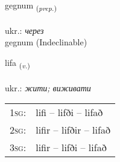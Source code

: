 \documentclass[frontgrid, backgrid]{flacards}\usepackage[]{graphicx}\usepackage[]{xcolor}
\begin{document}
\renewcommand{\blhead}{\vskip5pt {\small\bfseries\footnotesize Forsetning | прийменник }}
\renewcommand{\bcfoot}{\vskip5pt \hspace{2pt}{\small\bfseries\footnotesize 1K}}


{gegnum \small{\textsubscript{(\textit{prep.})}} \\[1ex]
\textphonetic{[cɛknʏm]} \\
ukr.: \emph{через} \\  [2ex]
gegnum (Indeclinable)}

\renewcommand{\flhead}{\vskip5pt \fboxsep=0pt {\small\bfseries\footnotesize Sagnorð | дієслово}}
\renewcommand{\fcfoot}{\vskip5pt \fboxsep=0pt \hspace{2pt}{\small\bfseries\footnotesize 1K}}

\renewcommand{\blhead}{\vskip5pt {\small\bfseries\footnotesize Sagnorð | дієслово }}
\renewcommand{\bcfoot}{\vskip5pt \hspace{2pt}{\small\bfseries\footnotesize 1K}}


{lifa \small{\textsubscript{(\textit{v.})}} \\[1ex] %
\textphonetic{[lɪːva]} \\
ukr.: \emph{жити; виживати} \\  [2ex]
\renewcommand*{\arraystretch}{0.8}
\begin{tabular}{p{1cm}l}
\textsc{1sg}: & lifi -- lifði -- lifað \\ 
\textsc{2sg}: & lifir -- lifðir -- lifað \\ 
\textsc{3sg}: & lifir -- lifði -- lifað \\ 
\end{tabular}
}

\renewcommand{\flhead}{\vskip5pt \fboxsep=0pt {\small\bfseries\footnotesize Atviksorð | прислівник}}
\renewcommand{\fcfoot}{\vskip5pt \fboxsep=0pt \hspace{2pt}{\small\bfseries\footnotesize 1K}}

\renewcommand{\blhead}{\vskip5pt {\small\bfseries\footnotesize Atviksorð | прислівник }}
\renewcommand{\bcfoot}{\vskip5pt \hspace{2pt}{\small\bfseries\footnotesize 1K}}
\end{document}

